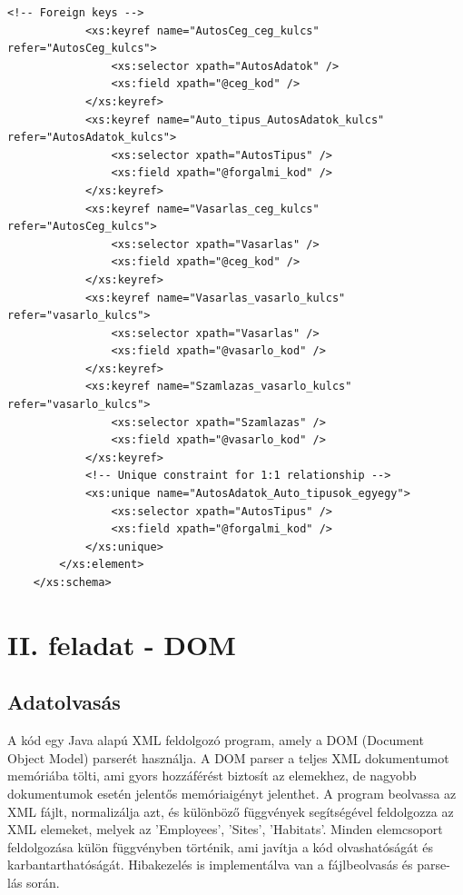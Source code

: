 \documentclass[12pt]{report}
\begin{document}
\begin{lstlisting}[caption={Az XSD dokumentum}]
			<!-- Foreign keys -->
			<xs:keyref name="AutosCeg_ceg_kulcs" refer="AutosCeg_kulcs">
				<xs:selector xpath="AutosAdatok" />
				<xs:field xpath="@ceg_kod" />
			</xs:keyref>
			<xs:keyref name="Auto_tipus_AutosAdatok_kulcs" refer="AutosAdatok_kulcs">
				<xs:selector xpath="AutosTipus" />
				<xs:field xpath="@forgalmi_kod" />
			</xs:keyref>
			<xs:keyref name="Vasarlas_ceg_kulcs" refer="AutosCeg_kulcs">
				<xs:selector xpath="Vasarlas" />
				<xs:field xpath="@ceg_kod" />
			</xs:keyref>
			<xs:keyref name="Vasarlas_vasarlo_kulcs" refer="vasarlo_kulcs">
				<xs:selector xpath="Vasarlas" />
				<xs:field xpath="@vasarlo_kod" />
			</xs:keyref>
			<xs:keyref name="Szamlazas_vasarlo_kulcs" refer="vasarlo_kulcs">
				<xs:selector xpath="Szamlazas" />
				<xs:field xpath="@vasarlo_kod" />
			</xs:keyref>
			<!-- Unique constraint for 1:1 relationship -->
			<xs:unique name="AutosAdatok_Auto_tipusok_egyegy">
				<xs:selector xpath="AutosTipus" />
				<xs:field xpath="@forgalmi_kod" />
			</xs:unique>
		</xs:element>
	</xs:schema>
\end{lstlisting}

\chapter{II. feladat - DOM}
\section{Adatolvasás}
\indent\indent A kód egy Java alapú XML feldolgozó program, amely a DOM (Document Object Model) parserét használja. A DOM parser a teljes XML dokumentumot memóriába tölti, ami gyors hozzáférést biztosít az elemekhez, de nagyobb dokumentumok esetén jelentős memóriaigényt jelenthet. A program beolvassa az XML fájlt, normalizálja azt, és különböző függvények segítségével feldolgozza az XML elemeket, melyek az 'Employees', 'Sites', 'Habitats'. Minden elemcsoport feldolgozása külön függvényben történik, ami javítja a kód olvashatóságát és karbantarthatóságát. Hibakezelés is implementálva van a fájlbeolvasás és parse-lás során.\\
\end{document}
